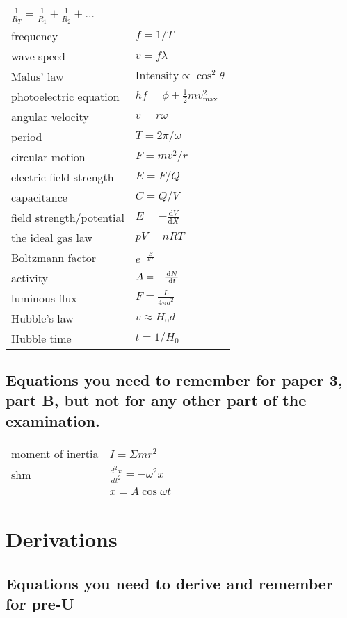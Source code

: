 \documentclass[main.tex]{subfiles}
\begin{document}
\begin{longtable}{ll}
\(\frac{1}{R_{T}} = \frac{1}{R_{1}} + \frac{1}{R_{2}} + \ldots\)\\
frequency & $f = 1/T$\\
wave speed & $v = f\lambda$\\
Malus' law & $\text{Intensity} \propto \cos^2{\theta}$\\
photoelectric equation & \(hf = \phi + \frac{1}{2}mv_{\max}^{2}\)\\
angular velocity & $v = r\omega$ \\
period & $T = 2\pi /\omega$\\
circular motion & $F = mv^2/r$\\
electric field strength & $E = F/Q$\\
capacitance & $C = Q/V$\\
field strength/potential & $E = -\frac{\text{d}V}{\text{d}{X}}$ \\
the ideal gas law & $pV = nRT$\\
Boltzmann factor & $e^{- \frac{E}{kT}}$ \\
activity & $A = -\frac{\,\mathrm{d} N}{\,\mathrm{d} t}$\\
luminous flux &\(F = \frac{L}{4\pi d^{2}}\)\\

Hubble's law &\(v \approx H_{0}d\)\\

Hubble time & $t = 1/H_{0}$\\

\end{longtable}

\subsection{Equations you need to remember for paper 3, part B, but not for any other part of the examination.}
\renewcommand*{\arraystretch}{2}
\begin{longtable}{ll}
moment of inertia & \(I = \Sigma mr^{2}\)\\
shm & \(\frac{d^{2}x}{dt^{2}} = - \omega^{2}x\)\\
& $x = A\cos{\omega t}$\\
\end{longtable}

\newpage
\section{Derivations}
\subsection{Equations you need to derive and remember for pre-U}
\end{document}
